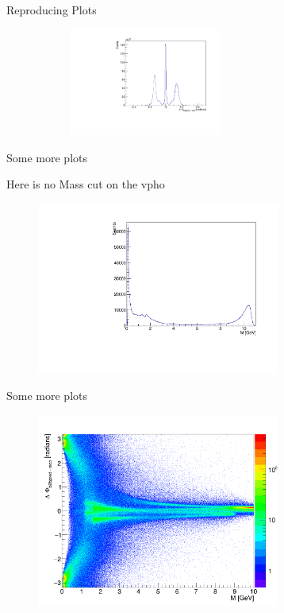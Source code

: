\documentclass[10pt]{beamer}
\begin{document}
{\begin{frame}{Reproducing Plots}
\begin{figure}
\begin{subfigure}{.5\textwidth}
		\label{fig:sub1}
	\end{subfigure}%
	\begin{subfigure}{.5\textwidth}
		\centering
		\includegraphics[width=5cm]{Plots/DeltaPhi.pdf}
	
		\label{fig:sub2}
	\end{subfigure}

	\label{fig:test}
\end{figure}

\end{frame}


\begin{frame}{Some more plots}

Here is no Mass cut on the vpho

	
	\begin{figure}
		\includegraphics[width=8cm]{Plots/vphoM.pdf}
	\end{figure}
	
	
\end{frame}



\begin{frame}{Some more plots}
	
	\begin{figure}
		\includegraphics[width=8cm]{Plots/PhiM.png}
	\end{figure}
	

\end{frame}}
\end{document}
